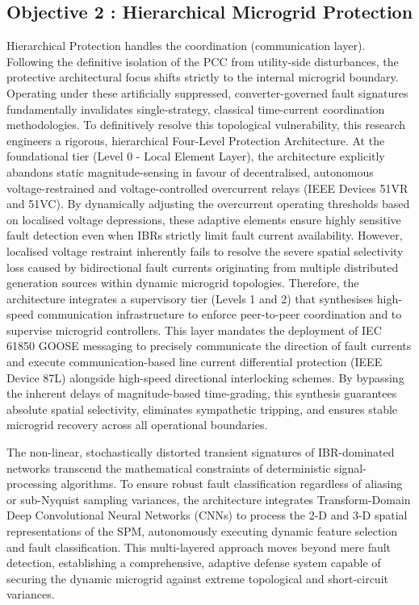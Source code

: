 \subsection{Objective 2 : Hierarchical Microgrid Protection}
Hierarchical Protection handles the coordination (communication layer). Following the definitive isolation of the PCC from utility-side disturbances, the protective architectural focus shifts strictly to the internal microgrid boundary. Operating under these artificially suppressed, converter-governed fault signatures fundamentally invalidates single-strategy, classical time-current coordination methodologies. To definitively resolve this topological vulnerability, this research engineers a rigorous, hierarchical Four-Level Protection Architecture. At the foundational tier (Level 0 - Local Element Layer), the architecture explicitly abandons static magnitude-sensing in favour of decentralised, autonomous voltage-restrained and voltage-controlled overcurrent relays (IEEE Devices 51VR and 51VC). By dynamically adjusting the overcurrent operating thresholds based on localised voltage depressions, these adaptive elements ensure highly sensitive fault detection even when IBRs strictly limit fault current availability. However, localised voltage restraint inherently fails to resolve the severe spatial selectivity loss caused by bidirectional fault currents originating from multiple distributed generation sources within dynamic microgrid topologies. Therefore, the architecture integrates a supervisory tier (Levels 1 and 2) that synthesises high-speed communication infrastructure to enforce peer-to-peer coordination and to supervise microgrid controllers. This layer mandates the deployment of IEC 61850 GOOSE messaging to precisely communicate the direction of fault currents and execute communication-based line current differential protection (IEEE Device 87L) alongside high-speed directional interlocking schemes. By bypassing the inherent delays of magnitude-based time-grading, this synthesis guarantees absolute spatial selectivity, eliminates sympathetic tripping, and ensures stable microgrid recovery across all operational boundaries.


The non-linear, stochastically distorted transient signatures of IBR-dominated networks transcend the mathematical constraints of deterministic signal-processing algorithms. To ensure robust fault classification regardless of aliasing or sub-Nyquist sampling variances, the architecture integrates Transform-Domain Deep Convolutional Neural Networks (CNNs) to process the 2-D and 3-D spatial representations of the SPM, autonomously executing dynamic feature selection and fault classification. This multi-layered approach moves beyond mere fault detection, establishing a comprehensive, adaptive defense system capable of securing the dynamic microgrid against extreme topological and short-circuit variances.
